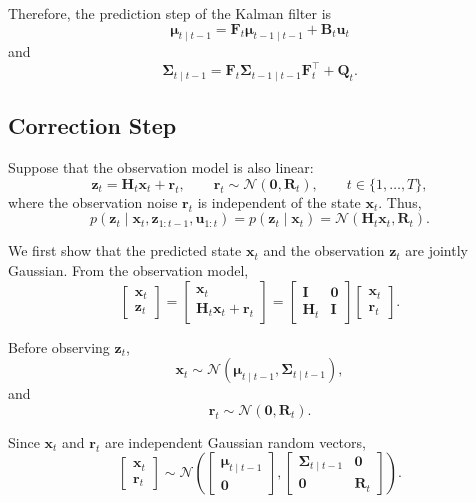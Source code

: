 \documentclass[../Bayesian_Inference.tex]{subfiles}
\begin{document}
Therefore, the prediction step of the Kalman filter is
\[
    \bm{\mu}_{t\mid t-1}=\mathbf{F}_t\bm{\mu}_{t-1\mid t-1}+\mathbf{B}_t\bm{u}_t
\]
and
\[
    \mathbf{\Sigma}_{t\mid t-1}=\mathbf{F}_t\mathbf{\Sigma}_{t-1\mid t-1}\mathbf{F}_t^\top+\mathbf{Q}_t.
\]

\subsection{Correction Step}

Suppose that the observation model is also linear:
\[
    \bm{z}_t = \mathbf{H}_t\bm{x}_t + \bm{r}_t,
    \qquad
    \bm{r}_t \sim \mathcal{N}(\bm{0},\mathbf{R}_t),
    \qquad
    t\in\{1,\dots,T\},
\]
where the observation noise $\bm{r}_t$ is independent of the state $\bm{x}_t$. Thus,
\[
    p(\bm{z}_t\mid\bm{x}_t,\bm{z}_{1:t-1},\bm{u}_{1:t})=p(\bm{z}_t\mid\bm{x}_t)=\mathcal{N}\left(\mathbf{H}_t\bm{x}_t,\mathbf{R}_t\right).
\]

We first show that the predicted state $\bm{x}_t$ and the observation $\bm{z}_t$ are jointly Gaussian. From the observation model,
\[
    \begin{bmatrix}
        \bm{x}_t \\
        \bm{z}_t
    \end{bmatrix}
    =
    \begin{bmatrix}
        \bm{x}_t \\
        \mathbf{H}_t\bm{x}_t+\bm{r}_t
    \end{bmatrix}
    =
    \begin{bmatrix}
        \mathbf{I} & \mathbf{0} \\
        \mathbf{H}_t & \mathbf{I}
    \end{bmatrix}
    \begin{bmatrix}
        \bm{x}_t \\
        \bm{r}_t
    \end{bmatrix}.
\]

Before observing $\bm{z}_t$,
\[
    \bm{x}_t\sim\mathcal{N}\left(\bm{\mu}_{t\mid t-1},\mathbf{\Sigma}_{t\mid t-1}\right),
\]
and
\[
    \bm{r}_t \sim \mathcal{N}\left(\bm{0},\mathbf{R}_t\right).
\]

Since $\bm{x}_t$ and $\bm{r}_t$ are independent Gaussian random vectors,
\[
    \begin{bmatrix}
        \bm{x}_t \\
        \bm{r}_t
    \end{bmatrix}
    \sim
    \mathcal{N}\left(
        \begin{bmatrix}
            \bm{\mu}_{t\mid t-1} \\
            \bm{0}
        \end{bmatrix},
        \begin{bmatrix}
            \mathbf{\Sigma}_{t\mid t-1} & \mathbf{0} \\
            \mathbf{0} & \mathbf{R}_t
        \end{bmatrix}
    \right).
\]
\end{document}
